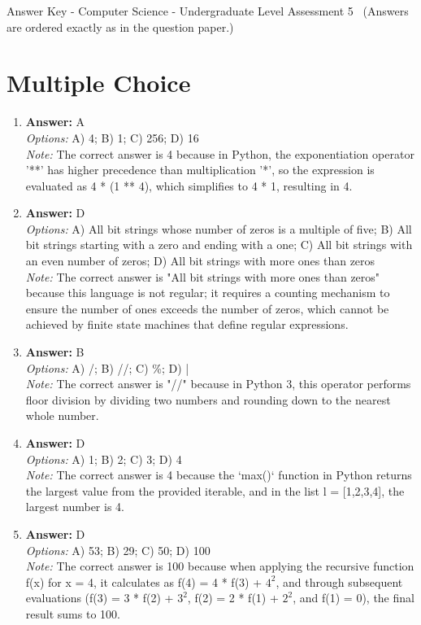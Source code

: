 \documentclass[12pt]{article}
\begin{document}
\begin{center}
Answer Key - Computer Science - Undergraduate Level Assessment 5 \
\small (Answers are ordered exactly as in the question paper.)
\end{center}

\section*{Multiple Choice}
\begin{enumerate}[label=\arabic*.]
\item \textbf{Answer:} A
\\ \textit{Options:} A) 4; B) 1; C) 256; D) 16
\\ \textit{Note:} The correct answer is 4 because in Python, the exponentiation operator '**' has higher precedence than multiplication '*', so the expression is evaluated as 4 * (1 ** 4), which simplifies to 4 * 1, resulting in 4.
\item \textbf{Answer:} D
\\ \textit{Options:} A) All bit strings whose number of zeros is a multiple of five; B) All bit strings starting with a zero and ending with a one; C) All bit strings with an even number of zeros; D) All bit strings with more ones than zeros
\\ \textit{Note:} The correct answer is "All bit strings with more ones than zeros" because this language is not regular; it requires a counting mechanism to ensure the number of ones exceeds the number of zeros, which cannot be achieved by finite state machines that define regular expressions.
\item \textbf{Answer:} B
\\ \textit{Options:} A) /; B) //; C) \%; D) |
\\ \textit{Note:} The correct answer is "//" because in Python 3, this operator performs floor division by dividing two numbers and rounding down to the nearest whole number.
\item \textbf{Answer:} D
\\ \textit{Options:} A) 1; B) 2; C) 3; D) 4
\\ \textit{Note:} The correct answer is 4 because the `max()` function in Python returns the largest value from the provided iterable, and in the list l = [1,2,3,4], the largest number is 4.
\item \textbf{Answer:} D
\\ \textit{Options:} A) 53; B) 29; C) 50; D) 100
\\ \textit{Note:} The correct answer is 100 because when applying the recursive function f(x) for x = 4, it calculates as f(4) = 4 * f(3) + $4^2$, and through subsequent evaluations (f(3) = 3 * f(2) + $3^2$, f(2) = 2 * f(1) + $2^2$, and f(1) = 0), the final result sums to 100.
\end{enumerate}
\end{document}
